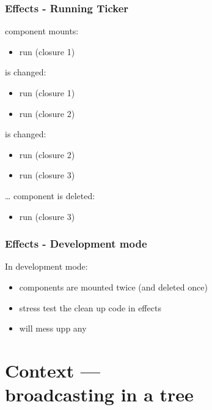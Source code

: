 \begin{frame}[fragile] \frametitle{Effects - Running Ticker}
component mounts:
\begin{itemize}
  \item run  (closure 1)
\end{itemize}
 is changed:
\begin{itemize}
  \item run  (closure 1)
  \item run  (closure 2)
\end{itemize}
 is changed:
\begin{itemize}
  \item run  (closure 2)
  \item run  (closure 3)
\end{itemize}
\ldots
component is deleted:
\begin{itemize}
  \item run  (closure 3)
\end{itemize}
\end{frame}

\begin{frame}[fragile] \frametitle{Effects - Development mode}
In development mode:
\begin{itemize}
  \item components are mounted twice (and deleted once)
  \item stress test the clean up code in effects
  \item will mess upp any 
\end{itemize}
\end{frame}

\section{Context ---\\broadcasting in a tree}

